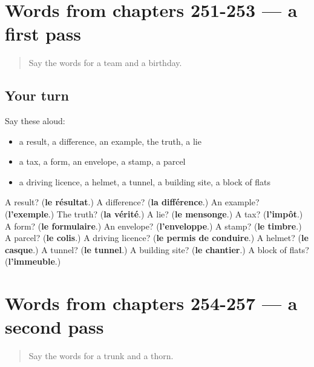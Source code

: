 \section[(dialogue)]{Words from chapters 251-253 — a first pass}

\label{lesson:FR-R257-first-pass-words-from-chapters-251-253}



\begin{quote}
Say the words for a team and a birthday.
\end{quote}

\subsection*{Your turn}
Say these aloud:

\begin{itemize}
\raggedright
  \item a result, a difference, an example, the truth, a lie
  \item a tax, a form, an envelope, a stamp, a parcel
  \item a driving licence, a helmet, a tunnel, a building site, a block of flats
\end{itemize}

\begin{tcolorbox}[breakable,colback=teal!4,colframe=teal!35!black,title={Before you move on}]
A result? (\textbf{le résultat}.) A difference? (\textbf{la différence}.) An example? (\textbf{l'exemple}.) The truth? (\textbf{la vérité}.) A lie? (\textbf{le mensonge}.) A tax? (\textbf{l'impôt}.) A form? (\textbf{le formulaire}.) An envelope? (\textbf{l'enveloppe}.) A stamp? (\textbf{le timbre}.) A parcel? (\textbf{le colis}.) A driving licence? (\textbf{le permis de conduire}.) A helmet? (\textbf{le casque}.) A tunnel? (\textbf{le tunnel}.) A building site? (\textbf{le chantier}.) A block of flats? (\textbf{l'immeuble}.)
\end{tcolorbox}
\section[(dialogue)]{Words from chapters 254-257 — a second pass}

\label{lesson:FR-R257-second-pass-words-from-chapters-254-257}



\begin{quote}
Say the words for a trunk and a thorn.
\end{quote}

